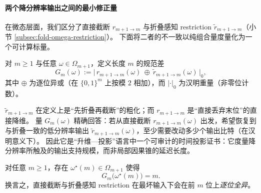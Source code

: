 \paragraph{两个降分辨率输出之间的最小修正量}
在微态层面，我们区分了直接截断 \(r_{m+1\to m}\) 与折叠感知 restriction \(\widetilde r_{m+1\to m}\)（小节 \ref{subsec:fold-omega-restriction}）。
下面将二者的不一致以纯组合量度量化为一个可计算标量。

\begin{definition}\label{def:fold-gauge-anomaly}
对 \(m\ge 1\) 与任意 \(\omega\in\Omega_{m+1}\)，定义长度 \(m\) 的规范差
$$
G_m(\omega)
:=\bigl|\,r_{m+1\to m}(\omega)\ \oplus\ \widetilde r_{m+1\to m}(\omega)\,\bigr|_0,
$$
其中 \(\oplus\) 为逐位异或（在 \(\{0,1\}^m\) 上按模 \(2\) 相加），而 \(|\cdot|_0\) 为汉明重量（非零位计数）。
\end{definition}

\begin{remark}
\(\widetilde r_{m+1\to m}\) 在定义上是“先折叠再截断”的粗化；而 \(r_{m+1\to m}\) 是“直接丢弃末位”的直接降维。
量 \(G_m(\omega)\) 精确回答：若从直接截断 \(r_{m+1\to m}(\omega)\) 出发，希望恢复到与折叠一致的低分辨率输出 \(\widetilde r_{m+1\to m}(\omega)\)，至少需要改动多少个输出比特（在汉明意义下）。
因此它是“升维—投影”语言中一个可审计的时间投影证书：它度量降分辨率所触及的输出支持规模，而非局部因果锥的延迟长度。
\end{remark}

\begin{theorem}\label{thm:fold-gauge-anomaly-max}
对任意 \(m\ge 1\)，存在 \(\omega^\star(m)\in\Omega_{m+1}\) 使得
$$
G_m\bigl(\omega^\star(m)\bigr)=m.
$$
换言之，直接截断与折叠感知 restriction 在最坏输入下会在前 \(m\) 位上\emph{逐位全异}。
\end{theorem}

